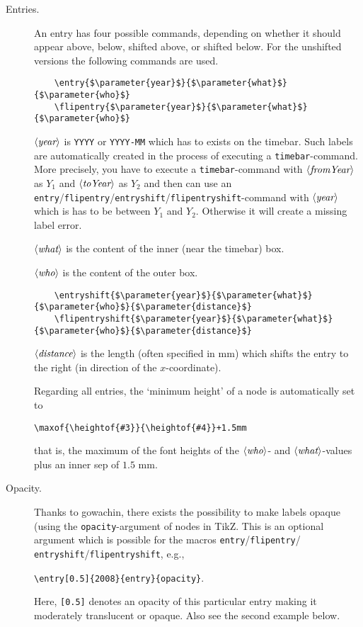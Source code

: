 \documentclass{article}
\newcommand{\parameter}[1]{\langle\normalfont\textit{#1}\rangle}
\begin{document}
\begin{description}
\item[Entries.] An entry has four possible commands, depending on whether it should appear above, below, shifted above, or shifted below. 
For the unshifted versions the following commands are used.
\begin{lstlisting}
	\entry{$\parameter{year}$}{$\parameter{what}$}{$\parameter{who}$}
	\flipentry{$\parameter{year}$}{$\parameter{what}$}{$\parameter{who}$}
\end{lstlisting}
$\parameter{year}$ is \texttt{YYYY} or \texttt{YYYY-MM} which has to exists on the timebar. 
Such labels are automatically created in the process of executing a \texttt{timebar}-command. 
More precisely, you have to execute a \texttt{timebar}-command with $\parameter{fromYear}$ as $Y_1$ and $\parameter{toYear}$ as $Y_2$ and then can use an \texttt{entry}/\texttt{flipentry}/\texttt{entryshift}/\texttt{flipentryshift}-command with $\parameter{year}$ which is has to be between $Y_1$ and $Y_2$.
Otherwise it will create a missing label error.

$\parameter{what}$ is the content of the inner (near the timebar) box.

$\parameter{who}$ is the content of the outer box.

\begin{lstlisting}
	\entryshift{$\parameter{year}$}{$\parameter{what}$}{$\parameter{who}$}{$\parameter{distance}$}
	\flipentryshift{$\parameter{year}$}{$\parameter{what}$}{$\parameter{who}$}{$\parameter{distance}$}
\end{lstlisting}

$\parameter{distance}$ is the length (often specified in mm) which shifts the entry to the right (in direction of the $x$-coordinate).

Regarding all entries, the `minimum height' of a node is automatically set to 
\begin{center}
\verb'\maxof{\heightof{#3}}{\heightof{#4}}+1.5mm'
\end{center}
that is, the maximum of the font heights of the $\parameter{who}$- and $\parameter{what}$-values plus an inner sep of $1.5$ mm.

\item[Opacity.] Thanks to gowachin, there exists the possibility to make labels opaque (using the \texttt{opacity}-argument of nodes in TikZ. 
This is an optional argument which is possible for the macros \texttt{entry}/\texttt{flipentry}/ \texttt{entryshift}/\texttt{flipentryshift}, e.g., 
\begin{center}
	\verb'\entry[0.5]{2008}{entry}{opacity}'.
\end{center}
Here, \verb'[0.5]' denotes an opacity of this particular entry making it moderately translucent or opaque. Also see the second example below.
\end{description}
\end{document}
